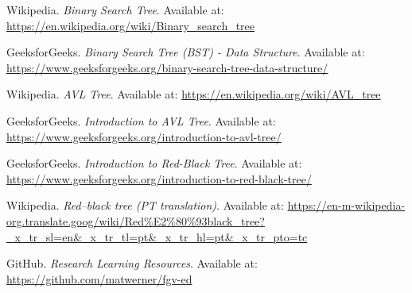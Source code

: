 \begin{thebibliography}{9}

Wikipedia.  
\textit{Binary Search Tree}.  
Available at: \url{https://en.wikipedia.org/wiki/Binary_search_tree}

GeeksforGeeks.  
\textit{Binary Search Tree (BST) - Data Structure}.  
Available at: \url{https://www.geeksforgeeks.org/binary-search-tree-data-structure/}

Wikipedia.  
\textit{AVL Tree}.  
Available at: \url{https://en.wikipedia.org/wiki/AVL_tree}

GeeksforGeeks.  
\textit{Introduction to AVL Tree}.  
Available at: \url{https://www.geeksforgeeks.org/introduction-to-avl-tree/}

GeeksforGeeks.  
\textit{Introduction to Red-Black Tree}.  
Available at: \url{https://www.geeksforgeeks.org/introduction-to-red-black-tree/}

Wikipedia.  
\textit{Red–black tree (PT translation)}.  
Available at: \url{https://en-m-wikipedia-org.translate.goog/wiki/Red%E2%80%93black_tree?_x_tr_sl=en&_x_tr_tl=pt&_x_tr_hl=pt&_x_tr_pto=tc}

GitHub.  
\textit{Research Learning Resources}.  
Available at: \url{https://github.com/matwerner/fgv-ed}


\end{thebibliography}
